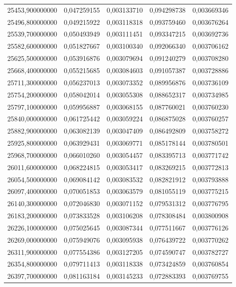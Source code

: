\begin{longtable}{rrrrr}
25453,900000000 & 0,047259155 & 0,003133710 & 0,094298738 & 0,003669346\\
25496,800000000 & 0,049215922 & 0,003118318 & 0,093759460 & 0,003676264\\
25539,700000000 & 0,050493949 & 0,003111451 & 0,093347215 & 0,003692736\\
25582,600000000 & 0,051827667 & 0,003100340 & 0,092066340 & 0,003706162\\
25625,500000000 & 0,053916876 & 0,003079694 & 0,091240279 & 0,003708280\\
25668,400000000 & 0,055215685 & 0,003084603 & 0,091057387 & 0,003728886\\
25711,300000000 & 0,056237013 & 0,003073352 & 0,089956876 & 0,003736109\\
25754,200000000 & 0,058042014 & 0,003055308 & 0,088652317 & 0,003734985\\
25797,100000000 & 0,059956887 & 0,003068155 & 0,087760021 & 0,003760230\\
25840,000000000 & 0,061725442 & 0,003059224 & 0,086875028 & 0,003760257\\
25882,900000000 & 0,063082139 & 0,003047409 & 0,086492809 & 0,003758272\\
25925,800000000 & 0,063929431 & 0,003069771 & 0,085178144 & 0,003780501\\
25968,700000000 & 0,066010260 & 0,003054457 & 0,083395713 & 0,003771742\\
26011,600000000 & 0,068224815 & 0,003053417 & 0,083269215 & 0,003772813\\
26054,500000000 & 0,069084142 & 0,003083532 & 0,082821912 & 0,003793888\\
26097,400000000 & 0,070051853 & 0,003063579 & 0,081055119 & 0,003775215\\
26140,300000000 & 0,072046830 & 0,003071152 & 0,079531312 & 0,003776795\\
26183,200000000 & 0,073833528 & 0,003106208 & 0,078308484 & 0,003800908\\
26226,100000000 & 0,075025645 & 0,003087344 & 0,077511667 & 0,003776126\\
26269,000000000 & 0,075949076 & 0,003095938 & 0,076439722 & 0,003770262\\
26311,900000000 & 0,077554386 & 0,003127205 & 0,074590747 & 0,003782727\\
26354,800000000 & 0,079711413 & 0,003118338 & 0,073424859 & 0,003760854\\
26397,700000000 & 0,081163184 & 0,003145233 & 0,072883393 & 0,003769755\\

\end{longtable}
